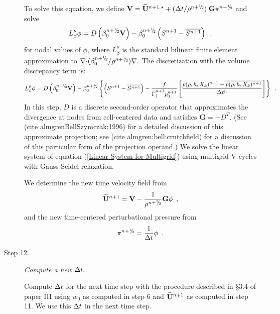 \begin{description}
To solve this equation, we define
${\bf V} = \Ubt^{n+1,\star} + ( \dt / \rho^\nph ) \; \mathbf{G} \pi^\nmh$ 
and solve
\begin{equation}
 L_\beta^\rho \phi = D \left ( \beta_0^{\nph} {\bf V} \right) - \beta_0^{\nph} 
\left(S^{n+1}-\overline{S^{n+1}} \right) \enskip, \label{Linear System for Multigrid}
\end{equation}
for nodal values of $\phi$, where $L_\beta^\rho$ is the standard bilinear
finite element approximation to $\nablab \cdotb ({\beta_0^\nph}/{\rho^\nph}) \nablab.$
The discretization with the volume discrepancy term is:
\begin{equation}
 L_\beta^\rho \phi =
   D \left ( \beta_0^{\nph} {\bf V} \right) - \beta_0^{\nph}\left\{ \left(S^{n+1}-\overline{S^{n+1}} \right)
- \frac{f}{\gammabar^{n+1} p_0^{n+1}}
\left[\frac{p(\rho,h,X_k)^{n+1} - \overline{p(\rho,h,X_k)^{n+1}}}{\Delta t^n}\right]\right\} \enskip.
\end{equation}
In this step, $D$ is a discrete second-order operator that approximates the 
divergence at nodes from cell-centered data and satisfies
$\mathbf{G} = -D^T.$ 
(See (cite almgrenBellSzymczak:1996) for a detailed discussion of this
approximate projection; see (cite almgren:bell:crutchfield) for a discussion
of this particular form of the projection operand.)  
We solve the linear system of equation (\ref{Linear System for Multigrid})
using multigrid V-cycles with Gauss-Seidel relaxation.

We determine the new time velocity field from
\begin{equation}
\Ubt^{n+1} = {\bf V} - \frac{1}{\rho^\nph} \mathbf{G} \phi \enskip ,
\end{equation}
and the new time-centered perturbational pressure from
\begin{equation}
  \pi^\nph = \frac{1}{\dt} \phi \enskip .
\end{equation}

\item[Step 12.] {\em Compute a new $\Delta t.$}

Compute $\Delta t$ for the next time step with the procedure described in \S 3.4 of paper III
using $w_0$ as computed in step 6 and
$\widetilde{{\bf U}}^{n+1}$ as computed in step 11.  We use this $\Delta t$ in the next time step. 


\end{description}

